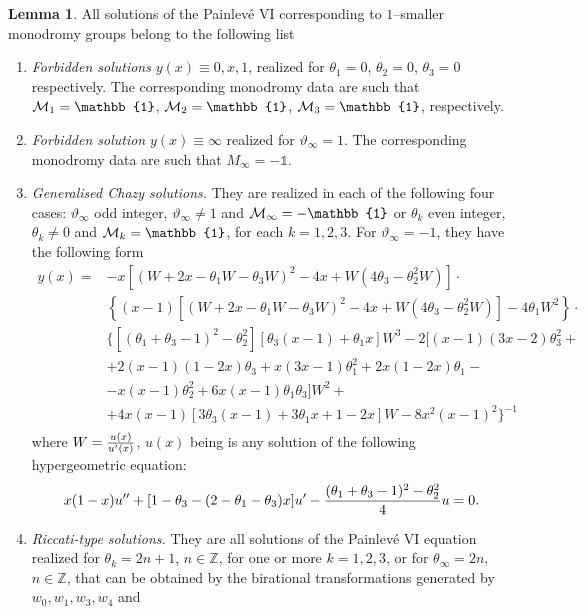\documentclass[12pt]{article}
\def\thi{{\vartheta_\infty}}
\newcommand{\ID}{\mathbb{1}}
\newcommand {\interi}{\mathbb Z}
\theoremstyle{definition}
\theoremstyle{theorem}
\newtheorem{lm}[df]{Lemma}
\begin{document}
\begin{lm} 
All solutions of the Painlev\'e VI corresponding to $1$--smaller
monodromy groups belong to the following list
\begin{enumerate}
\item {\it Forbidden solutions}\/ $y(x)\equiv 0,x,1$, realized for 
$\theta_1=0$, $\theta_2=0$, $\theta_3=0$ respectively. The corresponding
monodromy data are such that ${\cal M}_1=\ID$, ${\cal M}_2=\ID$, 
${\cal M}_3=\ID$, respectively. 
\item {\it Forbidden solution}\/ $y(x)\equiv\infty$ realized for
$\thi=1$. The corresponding monodromy data are such that
$M_\infty=-\ID$.
\item {\it Generalised Chazy solutions.}\/ They are realized in
each of the following four cases:  
$\thi$ odd integer, $\thi\neq 1$ and ${\cal M}_\infty=-\ID$ or
$\theta_k$ even integer, $\theta_k\neq0$ and ${\cal M}_k=\ID$, for each
$k=1,2,3$. For $\thi=-1$, they have the following form
\begin{equation}
\begin{array}{cl}
y(x)=&-x \left[(W+2 x-\theta_1 W-\theta_3 W)^2-4 x+W(4
\theta_3-\theta_2^2 W)\right]\cdot\\ 
&\left\{(x-1)\left[(W+2 x-\theta_1 W-\theta_3 W)^2-4 x+W(4
\theta_3-\theta_2^2 W)\right]-4 \theta_1 W^2\right\}\cdot\\ 
&\big\{[(\theta_1+\theta_3-1)^2-\theta_2^2][\theta_3(x-1)+\theta_1 x]W^3
-2[(x-1)(3x-2)\theta_3^2+\\ 
&+2 (x-1)(1 - 2 x)\theta_3+x(3x-1)\theta_1^2
+2 x(1-2x)\theta_1- \\ 
&-x(x-1)\theta_2^2+6x(x-1)\theta_1\theta_3] W^2+\\
&+4x(x-1)[3\theta_3(x-1)+3\theta_1 x+1-2x] W-8 x^2(x-1)^2\big\}^{-1}
\\ \end{array}
\label{DH1}\end{equation}
where $W={u(x)\over u'(x)}$, $u(x)$ being is any solution of the
following hypergeometric equation:
\begin{equation}
x(1-x)u''+ [1-\theta_3-(2-\theta_1-\theta_3)x]u'-
{(\theta_1+\theta_3-1)^2-\theta_2^2\over4} u=0.
\label{DH2}\end{equation}
\item {\it Riccati-type solutions.}\/ They are all solutions of the 
Painlev\'e VI equation realized for $\theta_k=2 n+1$, $n\in\interi$, 
for one or more $k=1,2,3$, or for $\theta_\infty=2 n$, $n\in\interi$, 
that can be obtained by
the birational transformations generated by $w_0,w_1,w_3,w_4$ and 

\end{enumerate}
\end{lm}
\end{document}
